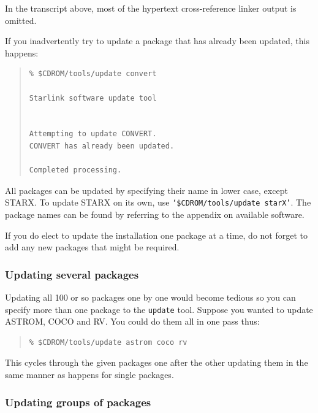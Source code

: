 \documentclass[twoside,11pt]{article}
\newcommand{\htmlref}[2]{#1}
\newcommand{\xlabel}[1]{}
\renewcommand{\_}{\texttt{\symbol{95}}}
\begin{document}
In the transcript above, most of the hypertext cross-reference linker
output is omitted.

If you inadvertently try to update a package that has already been
updated, this happens:

\begin{quote}
\begin{small}
\begin{verbatim}
% $CDROM/tools/update convert

Starlink software update tool


Attempting to update CONVERT.
CONVERT has already been updated.

Completed processing.
\end{verbatim}
\end{small}
\end{quote}

All packages can be updated by specifying their name in lower case,
except STARX\@.  To update STARX on its own, use
\texttt{`\$CDROM/tools/update starX'}.  The package names can be found by
referring to the appendix on \htmlref{available software}{available_software}.

If you do elect to update the installation one package at a time, do
not forget to add any new packages that might be required.

\subsubsection{\xlabel{updating_several_packages}Updating several packages}
\label{updating_several_packages}

Updating all 100 or so packages one by one would become tedious so you can
specify more than one package to the \texttt{update} tool.  Suppose you
wanted to update ASTROM, COCO and RV\@.  You could do them all in one pass thus:

\begin{quote}
\begin{verbatim}
% $CDROM/tools/update astrom coco rv
\end{verbatim}
\end{quote}

This cycles through the given packages one after the other updating
them in the same manner as happens for single packages.

\subsubsection{\xlabel{updating_groups_of_packages}Updating groups of packages}
\label{updating_groups_of_packages}
\end{document}
